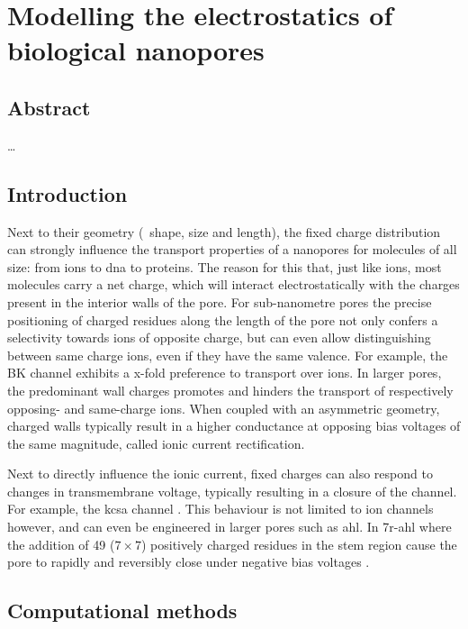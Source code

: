\chapter{Modelling the electrostatics of biological nanopores}\label{ch:electrostatics}

\section{Abstract}
\ldots

%
\section{Introduction}

Next to their geometry (\ie~shape, size and length), the fixed charge distribution can strongly influence the
transport properties of a nanopores for molecules of all size: from ions to \gls{dna} to proteins. The reason
for this that, just like ions, most molecules carry a net charge, which will interact electrostatically with
the charges present in the interior walls of the pore. For sub-nanometre pores the precise positioning of
charged residues along the length of the pore not only confers a selectivity towards ions of opposite charge,
but can even allow distinguishing between same charge ions, even if they have the same valence. For example,
the BK channel exhibits a x-fold preference to transport  over  ions. In larger pores, the
predominant wall charges promotes and hinders the transport of respectively opposing- and same-charge ions.
When coupled with an asymmetric geometry, charged walls typically result in a higher conductance at opposing
bias voltages of the same magnitude, called ionic current rectification.

Next to directly influence the ionic current, fixed charges can also respond to changes in transmembrane
voltage, typically resulting in a closure of the channel. For example, the \gls{kcsa} channel
\cite{Kopec-2019}. This behaviour is not limited to ion channels however, and can even be engineered in larger
pores such as \gls{ahl}. In \gls{7r-ahl} where the addition of 49 ($7\times7$) positively charged residues in
the stem region cause the pore to rapidly and reversibly close under negative bias voltages
\cite{Maglia-2009}.

\section{Computational methods}
%

